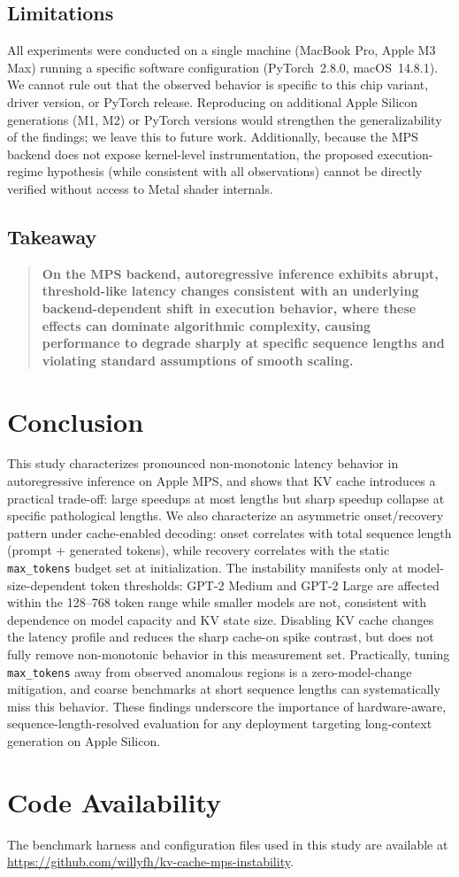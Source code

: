 \documentclass{article}
\begin{document}
\subsection{Limitations}

All experiments were conducted on a single machine (MacBook Pro, Apple M3 Max) running a specific software configuration (PyTorch~2.8.0, macOS~14.8.1). We cannot rule out that the observed behavior is specific to this chip variant, driver version, or PyTorch release. Reproducing on additional Apple Silicon generations (M1, M2) or PyTorch versions would strengthen the generalizability of the findings; we leave this to future work. Additionally, because the MPS backend does not expose kernel-level instrumentation, the proposed execution-regime hypothesis (while consistent with all observations) cannot be directly verified without access to Metal shader internals.

\subsection{Takeaway}

\begin{quote}
\textbf{On the MPS backend, autoregressive inference exhibits abrupt, threshold-like latency changes consistent with an underlying backend-dependent shift in execution behavior, where these effects can dominate algorithmic complexity, causing performance to degrade sharply at specific sequence lengths and violating standard assumptions of smooth scaling.}
\end{quote}

\section{Conclusion}

This study characterizes pronounced non-monotonic latency behavior in autoregressive inference on Apple MPS, and shows that KV cache introduces a practical trade-off: large speedups at most lengths but sharp speedup collapse at specific pathological lengths. We also characterize an asymmetric onset/recovery pattern under cache-enabled decoding: onset correlates with total sequence length (prompt + generated tokens), while recovery correlates with the static \texttt{max\_tokens} budget set at initialization. The instability manifests only at model-size-dependent token thresholds: GPT-2 Medium and GPT-2 Large are affected within the 128--768 token range while smaller models are not, consistent with dependence on model capacity and KV state size. Disabling KV cache changes the latency profile and reduces the sharp cache-on spike contrast, but does not fully remove non-monotonic behavior in this measurement set. Practically, tuning \texttt{max\_tokens} away from observed anomalous regions is a zero-model-change mitigation, and coarse benchmarks at short sequence lengths can systematically miss this behavior. These findings underscore the importance of hardware-aware, sequence-length-resolved evaluation for any deployment targeting long-context generation on Apple Silicon.

\section*{Code Availability}
The benchmark harness and configuration files used in this study are available at \url{https://github.com/willyfh/kv-cache-mps-instability}.



\end{document}
